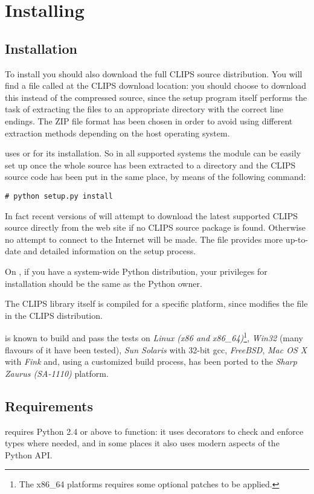 \chapter{Installing \pyclips{}\label{pyclips-setup}}

\section{Installation\label{pyclips-setup-installation}}

To install \pyclips{} you should also download the full CLIPS source
distribution. You will find a file called  at the
CLIPS download location: you should choose to download this instead of
the \UNIX{} compressed source, since the setup program itself performs
the task of extracting the files to an appropriate directory with the
correct line endings. The ZIP file format has been chosen in order to
avoid using different extraction methods depending on the host operating
system.

\pyclips{} uses  or  for its
installation. So in all supported systems the module can be easily
set up once the whole source has been extracted to a directory and
the CLIPS source code has been put in the same place, by means of the
following command:

\begin{verbatim}
# python setup.py install
\end{verbatim}

In fact recent versions of \pyclips{} will attempt to download the
latest supported CLIPS source directly from the \pyclips{} web site
if no CLIPS source package is found. Otherwise no attempt to connect
to the Internet will be made. The  file provides more
up-to-date and detailed information on the setup process.

On \UNIX{}, if you have a system-wide Python distribution, your
privileges for installation should be the same as the Python owner.

The CLIPS library itself is compiled for a specific platform, since
 modifies the  file in the CLIPS
distribution. 

\pyclips{} is known to build and pass the tests on \emph{Linux (x86 and
x86_64)}\footnote{The x86_64 platforms requires some optional patches
to be applied.}, \emph{Win32} (many flavours of it have been tested),
\emph{Sun Solaris} with 32-bit gcc, \emph{FreeBSD}, \emph{Mac OS X} with
\emph{Fink} and, using a customized build process, has been ported to the
\emph{Sharp Zaurus (SA-1110)} platform.


\section{Requirements\label{pyclips-setup-requirements}}

\pyclips{} requires Python 2.4 or above to function: it uses decorators
to check and enforce types where needed, and in some places it also uses
modern aspects of the Python API.
